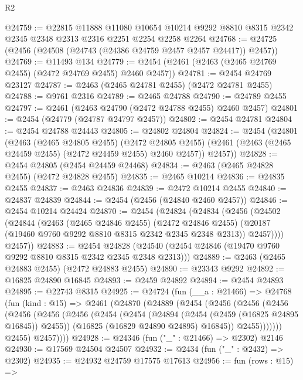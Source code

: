 \begin{lexlean}{R2}
\begin{coremodule}
@24759 := @22815
    @11888
    @11080
    @10654
    @10214
    @9292
    @8810
    @8315
    @2342
    @2345
    @2348
    @2313
    @2316
    @2251
    @2254
    @2258
    @2264
@24768 := @24725 (@2456 (@24508 (@24743 (@24386 @24759 @2457 @2457 @24417)) @2457))
@24769 := @11493 @134
@24779 := @2454 (@2461 (@2463 (@2465 @24769 @2455) (@2472 @24769 @2455) @2460 @2457))
@24781 := @2454 @24769 @23127
@24787 := @2463 (@2465 @24781 @2455) (@2472 @24781 @2455)
@24788 := @9761 @2316
@24789 := @2465 @24788
@24790 := @24789 @2455
@24797 := @2461 (@2463 @24790 (@2472 @24788 @2455) @2460 @2457)
@24801 := @2454 (@24779 (@24787 @24797 @2457))
@24802 := @2454 @24781
@24804 := @2454 @24788 @24443
@24805 := @24802 @24804
@24824 := @2454
    (@24801
      (@2463
        (@2465 @24805 @2455)
        (@2472 @24805 @2455)
        (@2461 (@2463 (@2465 @24459 @2455) (@2472 @24459 @2455) @2460 @2457))
        @2457))
@24828 := @2454 @24805 (@2454 @24459 @24468)
@24834 := @2463 (@2465 @24828 @2455) (@2472 @24828 @2455)
@24835 := @2465 @10214
@24836 := @24835 @2455
@24837 := @2463 @24836
@24839 := @2472 @10214 @2455
@24840 := @24837 @24839
@24844 := @2454 (@2456 (@24840 @2460 @2457))
@24846 := @2454 @10214 @24424
@24870 := @2454
    (@24824
      (@24834
        (@2456
          (@24502
            (@24844
              (@2463
                (@2465 @24846 @2455)
                (@2472 @24846 @2455)
                (@20187 (@19460 @9760 @9292 @8810 @8315 @2342 @2345 @2348 @2313))
                @2457))))
        @2457))
@24883 := @2454
    @24828
    (@24540 (@2454 @24846 (@19470 @9760 @9292 @8810 @8315 @2342 @2345 @2348 @2313)))
@24889 := @2463 (@2465 @24883 @2455) (@2472 @24883 @2455)
@24890 := @23343 @9292
@24892 := @16825 @24890 @16845
@24893 := @2459 @24892
@24894 := @2454 @24893
@24895 := @22743 @8315
@24925 := @24724
    (fun (__a : @21466) =>
    @24768
      (fun (kind : @15) =>
      @2461
        (@24870
          (@24889
            (@2454
              (@2456
                (@2456
                  (@2456
                    (@2456
                      (@2456
                        (@2456
                          (@2454
                            (@2454
                              (@24894 (@2454 (@2459 (@16825 @24895 @16845)) @2455))
                              (@16825 (@16829 @24890 @24895) @16845))
                            @2455)))))))
              @2455)
            @2457))))
@24928 := @24346 (fun ("_" : @21466) => @2302) @2146
@24930 := @17569 @24504 @24507
@24932 := @2434 (fun ("_" : @2432) => @2302)
@24935 := @24932 @24759 @17575 @17613
@24956 := fun (rows : @15) =>

\end{coremodule}
\end{lexlean}
